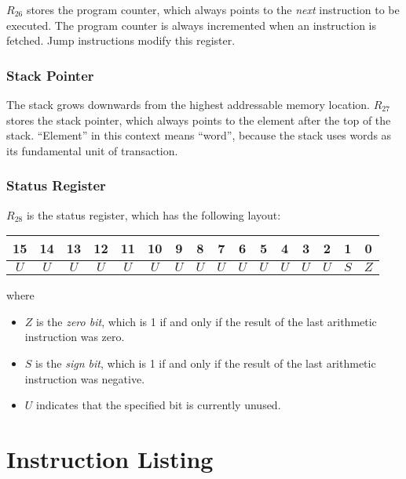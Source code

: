 \documentclass[12pt]{scrartcl}
\begin{document}
$R_{26}$ stores the program counter, which always points to the \textit{next} instruction to be executed. The program counter is always incremented when an instruction is fetched. Jump instructions modify this register.


\subsubsection{Stack Pointer}

The stack grows downwards from the highest addressable memory location. $R_{27}$ stores the stack pointer, which always points to the element after the top of the stack. ``Element'' in this context means ``word'', because the stack uses words as its fundamental unit of transaction.


\subsubsection{Status Register}

$R_{28}$ is the status register, which has the following layout:

\begin{center}
  \begin{tabular}{| c | c | c | c | c | c | c | c | c | c | c | c | c | c | c | c |}
    \hline
    15 & 14 & 13 & 12 & 11 & 10 & 9 & 8 & 7 & 6 & 5 & 4 & 3 & 2 & 1 & 0 \\
    \hline
    $U$ & $U$ & $U$ & $U$ & $U$ & $U$ & $U$ & $U$ & $U$ & $U$ & $U$ & $U$ & $U$ & $U$ & $S$ & $Z$ \\
    \hline
  \end{tabular}
\end{center}

\noindent where

\begin{itemize}
	\item $Z$ is the \textit{zero bit}, which is 1 if and only if the result of the last arithmetic instruction was zero.
	\item $S$ is the \textit{sign bit}, which is 1 if and only if the result of the last arithmetic instruction was negative.
	\item $U$ indicates that the specified bit is currently unused.
\end{itemize}


\section{Instruction Listing}
\end{document}
